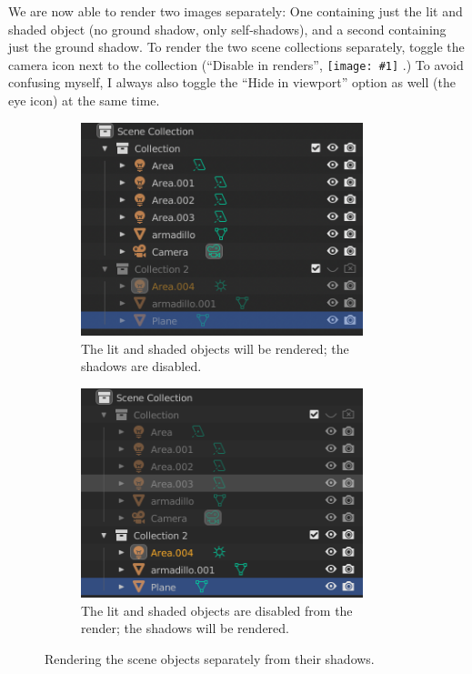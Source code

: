 \documentclass[10pt]{article}
\DeclareRobustCommand{\inlinepic}[1]{%
  \begingroup\normalfont
  \texttt{[image: \#1]}%
  \endgroup
}
\begin{document}
We are now able to render two images separately: One containing just the lit and shaded object (no ground shadow, only self-shadows), and a second containing just the ground shadow. To render the two scene collections separately, toggle the camera icon next to the collection (``Disable in renders'', \inlinepic{images/disable-in-viewport-render.png}.) To avoid confusing myself, I always also toggle the ``Hide in viewport'' option as well (the eye icon) at the same time.
\begin{figure}[H]
    \centering
    \captionsetup{width=0.8\textwidth}
    \begin{subfigure}[b]{0.4\textwidth}
     \centering
     \includegraphics[width=0.9\textwidth]{images/collection-on-shadow-off.png}
     \caption{The lit and shaded objects will be rendered; the shadows are disabled.}
    \end{subfigure} \hspace{3mm}
    \begin{subfigure}[b]{0.4\textwidth}
     \centering
     \includegraphics[width=0.9\textwidth]{images/collection-off-shadow-on.png}
     \caption{The lit and shaded objects are disabled from the render; the shadows will be rendered.}
    \end{subfigure}
    \caption{Rendering the scene objects separately from their shadows.}
    \label{fig:disable-in-render}
\end{figure}
\end{document}
